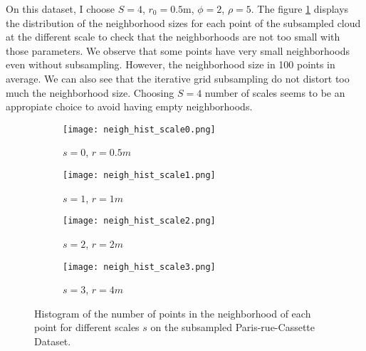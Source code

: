 \documentclass{article}
\begin{document}
On this dataset, I choose $S=4$, $r_0=0.5$m, $\phi=2$, $\rho=5$. The figure \ref{fig:neigh_hist} displays the distribution of the neighborhood sizes for each point of the subsampled cloud at the different scale to check that the neighborhoods are not too small with those parameters. We observe that some points have very small neighborhoods even without subsampling. However, the neighborhood size in 100 points in average. We can also see that the iterative grid subsampling do not distort too much the neighborhood size. Choosing $S=4$ number of scales seems to be an appropiate choice to avoid having empty neighborhoods.  


\begin{figure}
    \begin{subfigure}{0.5\textwidth}
        \centering
        \texttt{[image: neigh\_hist\_scale0.png]}
        \caption{$s=0$, $r=0.5m$}
    \end{subfigure}
    \hfill
    \begin{subfigure}{0.5\textwidth}
        \centering
        \texttt{[image: neigh\_hist\_scale1.png]}
        \caption{$s=1$, $r=1m$}
    \end{subfigure}
    \hfill
    \begin{subfigure}{0.5\textwidth}
        \centering
        \texttt{[image: neigh\_hist\_scale2.png]}
        \caption{$s=2$, $r=2m$}
    \end{subfigure}
    \hfill
    \begin{subfigure}{0.5\textwidth}
        \centering
        \texttt{[image: neigh\_hist\_scale3.png]}
        \caption{$s=3$, $r=4m$}
    \end{subfigure}
    \caption{Histogram of the number of points in the neighborhood of each point for different scales $s$ on the subsampled Paris-rue-Cassette Dataset.}
    \label{fig:neigh_hist}
\end{figure}
\end{document}
